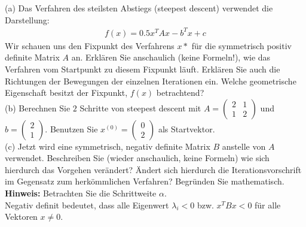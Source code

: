 \documentclass{scrartcl}
\begin{document}
	(a)
	Das Verfahren des steilsten Abstiegs (steepest descent) verwendet die Darstellung:
	\begin{align*}
		f(x) = 0.5x^TAx - b^Tx + c
	\end{align*}
	Wir schauen uns den Fixpunkt des Verfahrens $x*$ für die symmetrisch positiv definite Matrix $A$ an.
	\n 
	Erklären Sie anschaulich (keine Formeln!), wie das Verfahren vom Startpunkt zu diesem Fixpunkt läuft. Erklären Sie auch die Richtungen der Bewegungen der einzelnen Iterationen ein.
	\n 
	Welche geometrische Eigenschaft besitzt der Fixpunkt, $f(x)$ betrachtend?
	\lbreak \lbreak \lbreak
	\\
	(b)
	Berechnen Sie $2$ Schritte von steepest descent mit 
	$A= \begin{pmatrix}
		2 & 1\\
		1 & 2
	\end{pmatrix}$ und 
	$b= \begin{pmatrix}
		2 \\ 1
	\end{pmatrix}$.
	Benutzen Sie $x^{(0)} = \begin{pmatrix}
		0 \\ 2
	\end{pmatrix}$ als Startvektor.
	\lbreak \lbreak \lbreak
	\\
	(c)
	Jetzt wird eine symmetrisch, negativ definite Matrix $B$ anstelle von $A$ verwendet.
	\n 
	Beschreiben Sie (wieder anschaulich, keine Formeln) wie sich hierdurch das Vorgehen verändert?
	\n 
	Ändert sich hierdurch die Iterationsvorschrift im Gegensatz zum herkömmlichen Verfahren? Begründen Sie mathematisch.
	\n 
	\textbf{Hinweis:} Betrachten Sie die Schrittweite $\alpha$. \\
	Negativ definit bedeutet, dass alle Eigenwert $\lambda_i < 0$ bzw. $x^TBx<0$ für alle Vektoren $x\ne0$.

	
	
\end{document}
